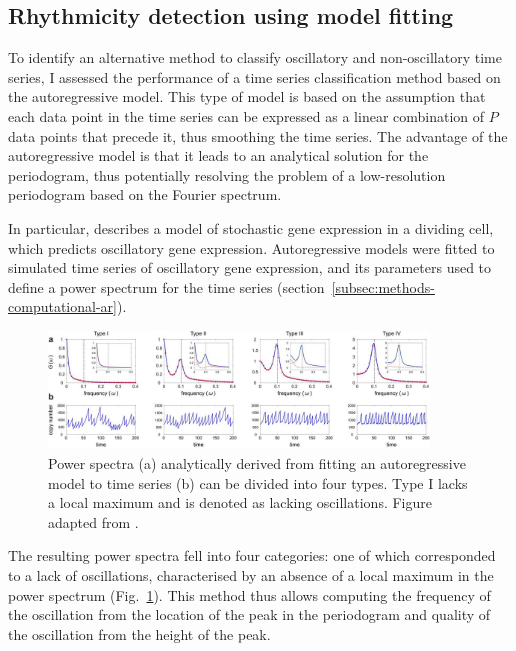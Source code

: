 \subsection{Rhythmicity detection using model fitting}
\label{subsec:analysis-classification-ar}

To identify an alternative method to classify oscillatory and non-oscillatory time series, I assessed the performance of a time series classification method based on the autoregressive model.
This type of model is based on the assumption that each data point in the time series can be expressed as a linear combination of $P$ data points that precede it, thus smoothing the time series.
The advantage of the autoregressive model is that it leads to an analytical solution for the periodogram, thus potentially resolving the problem of a low-resolution periodogram based on the Fourier spectrum.

In particular, \textcite{jiaFrequencyDomainAnalysis2021} describes a model of stochastic gene expression in a dividing cell, which predicts oscillatory gene expression.
Autoregressive models were fitted to simulated time series of oscillatory gene expression, and its parameters used to define a power spectrum for the time series (section~\ref{subsec:methods-computational-ar}).


\begin{figure}
  \centering
  \includegraphics[width=0.9\textwidth]{jiaFrequencyDomainAnalysis2020_2ab_adapted}
  \caption[
    Power spectra analytically derived from fitting an autoregressive model to time series can be divided into four types
  ]{
    Power spectra (a) analytically derived from fitting an autoregressive model to time series (b) can be divided into four types.
    Type I lacks a local maximum and is denoted as lacking oscillations.
    Figure adapted from \textcite{jiaFrequencyDomainAnalysis2020}.
  }
  \label{fig:analysis-ar-classification}
\end{figure}

The resulting power spectra fell into four categories: one of which corresponded to a lack of oscillations, characterised by an absence of a local maximum in the power spectrum (Fig.\ \ref{fig:analysis-ar-classification}).
This method thus allows computing the frequency of the oscillation from the location of the peak in the periodogram and quality of the oscillation from the height of the peak.

